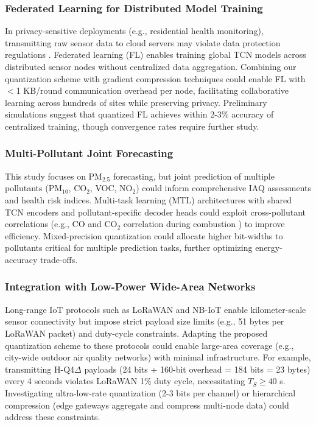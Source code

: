 \subsubsection{Federated Learning for Distributed Model Training}

In privacy-sensitive deployments (e.g., residential health monitoring), transmitting raw sensor data to cloud servers may violate data protection regulations \cite{quang2025ai}. Federated learning (FL) enables training global TCN models across distributed sensor nodes without centralized data aggregation. Combining our quantization scheme with gradient compression techniques \cite{khan2024artificial} could enable FL with $<$1 KB/round communication overhead per node, facilitating collaborative learning across hundreds of sites while preserving privacy. Preliminary simulations suggest that quantized FL achieves within 2-3\% accuracy of centralized training, though convergence rates require further study.

\subsubsection{Multi-Pollutant Joint Forecasting}

This study focuses on PM$_{2.5}$ forecasting, but joint prediction of multiple pollutants (PM$_{10}$, CO$_2$, VOC, NO$_2$) could inform comprehensive IAQ assessments and health risk indices. Multi-task learning (MTL) architectures with shared TCN encoders and pollutant-specific decoder heads could exploit cross-pollutant correlations (e.g., CO and CO$_2$ correlation during combustion \cite{karmakar2024exploring}) to improve efficiency. Mixed-precision quantization could allocate higher bit-widths to pollutants critical for multiple prediction tasks, further optimizing energy-accuracy trade-offs.

\subsubsection{Integration with Low-Power Wide-Area Networks}

Long-range IoT protocols such as LoRaWAN and NB-IoT enable kilometer-scale sensor connectivity but impose strict payload size limits (e.g., 51 bytes per LoRaWAN packet) and duty-cycle constraints. Adapting the proposed quantization scheme to these protocols could enable large-area coverage (e.g., city-wide outdoor air quality networks) with minimal infrastructure. For example, transmitting H-Q4$\Delta$ payloads (24 bits + 160-bit overhead = 184 bits = 23 bytes) every 4 seconds violates LoRaWAN 1\% duty cycle, necessitating $T_S \geq 40$ s. Investigating ultra-low-rate quantization (2-3 bits per channel) or hierarchical compression (edge gateways aggregate and compress multi-node data) could address these constraints.

